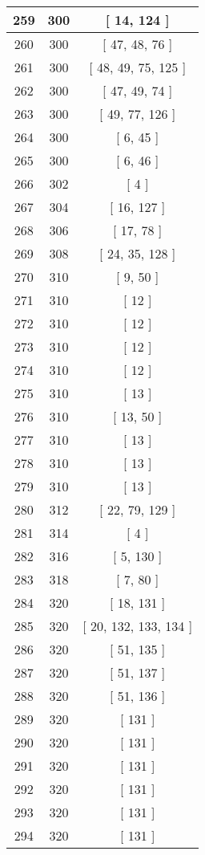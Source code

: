\begin{center}
\begin{longtable}[H]{|| c c c ||}
\\\hline
259 & 300 & [ 14, 124 ]
\\\hline
260 & 300 & [ 47, 48, 76 ]
\\\hline
261 & 300 & [ 48, 49, 75, 125 ]
\\\hline
262 & 300 & [ 47, 49, 74 ]
\\\hline
263 & 300 & [ 49, 77, 126 ]
\\\hline
264 & 300 & [ 6, 45 ]
\\\hline
265 & 300 & [ 6, 46 ]
\\\hline
266 & 302 & [ 4 ]
\\\hline
267 & 304 & [ 16, 127 ]
\\\hline
268 & 306 & [ 17, 78 ]
\\\hline
269 & 308 & [ 24, 35, 128 ]
\\\hline
270 & 310 & [ 9, 50 ]
\\\hline
271 & 310 & [ 12 ]
\\\hline
272 & 310 & [ 12 ]
\\\hline
273 & 310 & [ 12 ]
\\\hline
274 & 310 & [ 12 ]
\\\hline
275 & 310 & [ 13 ]
\\\hline
276 & 310 & [ 13, 50 ]
\\\hline
277 & 310 & [ 13 ]
\\\hline
278 & 310 & [ 13 ]
\\\hline
279 & 310 & [ 13 ]
\\\hline
280 & 312 & [ 22, 79, 129 ]
\\\hline
281 & 314 & [ 4 ]
\\\hline
282 & 316 & [ 5, 130 ]
\\\hline
283 & 318 & [ 7, 80 ]
\\\hline
284 & 320 & [ 18, 131 ]
\\\hline
285 & 320 & [ 20, 132, 133, 134 ]
\\\hline
286 & 320 & [ 51, 135 ]
\\\hline
287 & 320 & [ 51, 137 ]
\\\hline
288 & 320 & [ 51, 136 ]
\\\hline
289 & 320 & [ 131 ]
\\\hline
290 & 320 & [ 131 ]
\\\hline
291 & 320 & [ 131 ]
\\\hline
292 & 320 & [ 131 ]
\\\hline
293 & 320 & [ 131 ]
\\\hline
294 & 320 & [ 131 ]
\\\hline

\end{longtable}
\end{center}

